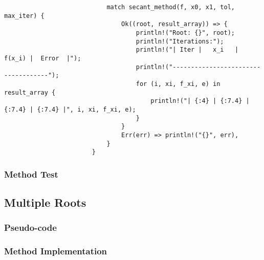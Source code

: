 \documentclass{article}
\begin{document}
\begin{verbatim}
                            match secant_method(f, x0, x1, tol, max_iter) {
                                Ok((root, result_array)) => {
                                    println!("Root: {}", root);
                                    println!("Iterations:");
                                    println!("| Iter |   x_i   | f(x_i) |  Error  |");
                                    println!("------------------------------------");
                                    for (i, xi, f_xi, e) in result_array {
                                        println!("| {:4} | {:7.4} | {:7.4} | {:7.4} |", i, xi, f_xi, e);
                                    }
                                }
                                Err(err) => println!("{}", err),
                            }
                        }

                \end{verbatim}
        \subsubsection{Method Test}

    \subsection{Multiple Roots}
        \subsubsection{Pseudo-code}
        \subsubsection{Method Implementation}
\end{document}
